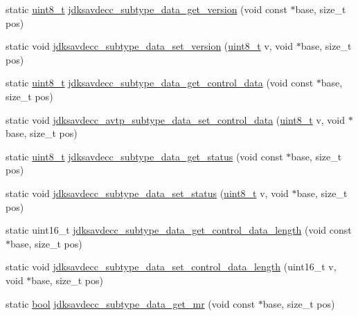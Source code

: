 \begin{DoxyCompactItemize}
\item 
static \hyperlink{stdint_8h_aba7bc1797add20fe3efdf37ced1182c5}{uint8\+\_\+t} \hyperlink{group__jdksavdecc__subtype__data_ga4bcff075bd85bab9ae393256a29ad114}{jdksavdecc\+\_\+subtype\+\_\+data\+\_\+get\+\_\+version} (void const $\ast$base, size\+\_\+t pos)
\item 
static void \hyperlink{group__jdksavdecc__subtype__data_ga3b2734ddeacb24c5f1e5918b954b44f6}{jdksavdecc\+\_\+subtype\+\_\+data\+\_\+set\+\_\+version} (\hyperlink{stdint_8h_aba7bc1797add20fe3efdf37ced1182c5}{uint8\+\_\+t} v, void $\ast$base, size\+\_\+t pos)
\item 
static \hyperlink{stdint_8h_aba7bc1797add20fe3efdf37ced1182c5}{uint8\+\_\+t} \hyperlink{group__jdksavdecc__subtype__data_ga245e3e44444d67149c7a861c45f0f8d8}{jdksavdecc\+\_\+subtype\+\_\+data\+\_\+get\+\_\+control\+\_\+data} (void const $\ast$base, size\+\_\+t pos)
\item 
static void \hyperlink{group__jdksavdecc__subtype__data_ga6f67bb7ecf589b67eb0ba7a6e685b008}{jdksavdecc\+\_\+avtp\+\_\+subtype\+\_\+data\+\_\+set\+\_\+control\+\_\+data} (\hyperlink{stdint_8h_aba7bc1797add20fe3efdf37ced1182c5}{uint8\+\_\+t} v, void $\ast$base, size\+\_\+t pos)
\item 
static \hyperlink{stdint_8h_aba7bc1797add20fe3efdf37ced1182c5}{uint8\+\_\+t} \hyperlink{group__jdksavdecc__subtype__data_gafd5ac7644141dc277807118b33e90cf9}{jdksavdecc\+\_\+subtype\+\_\+data\+\_\+get\+\_\+status} (void const $\ast$base, size\+\_\+t pos)
\item 
static void \hyperlink{group__jdksavdecc__subtype__data_gae59915171a8f8f0f433471b4b81a0f2d}{jdksavdecc\+\_\+subtype\+\_\+data\+\_\+set\+\_\+status} (\hyperlink{stdint_8h_aba7bc1797add20fe3efdf37ced1182c5}{uint8\+\_\+t} v, void $\ast$base, size\+\_\+t pos)
\item 
static uint16\+\_\+t \hyperlink{group__jdksavdecc__subtype__data_gab439afc9f07697786f122fc5ecf4070d}{jdksavdecc\+\_\+subtype\+\_\+data\+\_\+get\+\_\+control\+\_\+data\+\_\+length} (void const $\ast$base, size\+\_\+t pos)
\item 
static void \hyperlink{group__jdksavdecc__subtype__data_ga3d0f6979376194d07a4522c062407d80}{jdksavdecc\+\_\+subtype\+\_\+data\+\_\+set\+\_\+control\+\_\+data\+\_\+length} (uint16\+\_\+t v, void $\ast$base, size\+\_\+t pos)
\item 
static \hyperlink{avb__gptp_8h_af6a258d8f3ee5206d682d799316314b1}{bool} \hyperlink{group__jdksavdecc__subtype__data_ga0fc5dfd7c0c0ecbe3b4586111f08856a}{jdksavdecc\+\_\+subtype\+\_\+data\+\_\+get\+\_\+mr} (void const $\ast$base, size\+\_\+t pos)

\end{DoxyCompactItemize}
